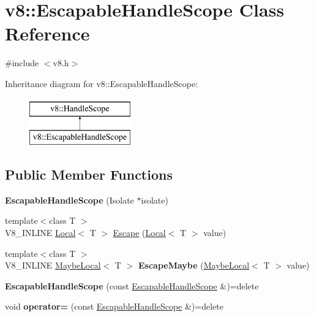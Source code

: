 \hypertarget{classv8_1_1EscapableHandleScope}{}\section{v8\+:\+:Escapable\+Handle\+Scope Class Reference}
\label{classv8_1_1EscapableHandleScope}


{\ttfamily \#include $<$v8.\+h$>$}

Inheritance diagram for v8\+:\+:Escapable\+Handle\+Scope\+:\begin{figure}[H]
\begin{center}
\leavevmode
\includegraphics[height=2.000000cm]{classv8_1_1EscapableHandleScope}
\end{center}
\end{figure}
\subsection*{Public Member Functions}
\begin{DoxyCompactItemize}
\item 
\mbox{\label{classv8_1_1EscapableHandleScope_aea39a7fd4dee6da31f3921ff891e1731}} 
{\bfseries Escapable\+Handle\+Scope} (Isolate $\ast$isolate)
\item 
{\footnotesize template$<$class T $>$ }\\V8\+\_\+\+I\+N\+L\+I\+NE \mbox{\hyperlink{classv8_1_1Local}{Local}}$<$ T $>$ \mbox{\hyperlink{classv8_1_1EscapableHandleScope_afdf0d3850978f65d1a827f78b3a2b6fd}{Escape}} (\mbox{\hyperlink{classv8_1_1Local}{Local}}$<$ T $>$ value)
\item 
\mbox{\label{classv8_1_1EscapableHandleScope_a7e0ca63c86c3f0cbc87784f601cf4ad5}} 
{\footnotesize template$<$class T $>$ }\\V8\+\_\+\+I\+N\+L\+I\+NE \mbox{\hyperlink{classv8_1_1MaybeLocal}{Maybe\+Local}}$<$ T $>$ {\bfseries Escape\+Maybe} (\mbox{\hyperlink{classv8_1_1MaybeLocal}{Maybe\+Local}}$<$ T $>$ value)
\item 
\mbox{\label{classv8_1_1EscapableHandleScope_a1a50d87127787da65c679a361fc8967d}} 
{\bfseries Escapable\+Handle\+Scope} (const \mbox{\hyperlink{classv8_1_1EscapableHandleScope}{Escapable\+Handle\+Scope}} \&)=delete
\item 
\mbox{\label{classv8_1_1EscapableHandleScope_a95b116173bfb5a478068caa0ff275999}} 
void {\bfseries operator=} (const \mbox{\hyperlink{classv8_1_1EscapableHandleScope}{Escapable\+Handle\+Scope}} \&)=delete
\end{DoxyCompactItemize}
